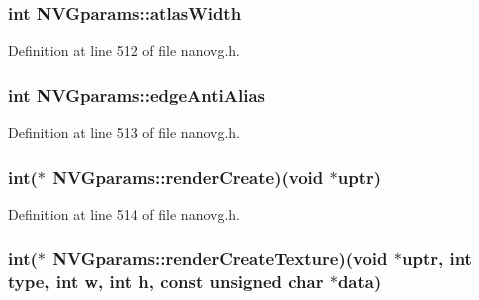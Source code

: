 \hypertarget{struct_n_v_gparams_a6a77310845f0d6ca24955582625fc2f3}{
\subsubsection[{atlas\+Width}]{\setlength{\rightskip}{0pt plus 5cm}int N\+V\+Gparams\+::atlas\+Width}}\label{struct_n_v_gparams_a6a77310845f0d6ca24955582625fc2f3}


Definition at line 512 of file nanovg.\+h.

\hypertarget{struct_n_v_gparams_a273c8d7199cc5dc4f1a69e12f0b90229}{
\subsubsection[{edge\+Anti\+Alias}]{\setlength{\rightskip}{0pt plus 5cm}int N\+V\+Gparams\+::edge\+Anti\+Alias}}\label{struct_n_v_gparams_a273c8d7199cc5dc4f1a69e12f0b90229}


Definition at line 513 of file nanovg.\+h.

\hypertarget{struct_n_v_gparams_ae62f4124bb147d342edfcbc8c233c782}{
\subsubsection[{render\+Create}]{\setlength{\rightskip}{0pt plus 5cm}int($\ast$ N\+V\+Gparams\+::render\+Create)(void $\ast$uptr)}}\label{struct_n_v_gparams_ae62f4124bb147d342edfcbc8c233c782}


Definition at line 514 of file nanovg.\+h.

\hypertarget{struct_n_v_gparams_a5c15e9da1c7021d104ac0915ddf8bcdf}{
\subsubsection[{render\+Create\+Texture}]{\setlength{\rightskip}{0pt plus 5cm}int($\ast$ N\+V\+Gparams\+::render\+Create\+Texture)(void $\ast$uptr, int type, int w, int h, const unsigned char $\ast$data)}}\label{struct_n_v_gparams_a5c15e9da1c7021d104ac0915ddf8bcdf}


